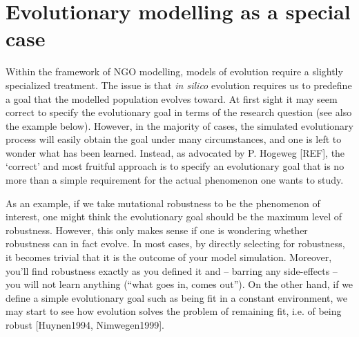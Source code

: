 \section{Evolutionary modelling as a special case}

Within the framework of NGO modelling, models of evolution require a slightly specialized treatment. The issue is that \emph{in silico} evolution requires us to predefine a goal that the modelled population evolves toward. At first sight it may seem correct to specify the evolutionary goal in terms of the research question (see also the example below). However, in the majority of cases, the simulated evolutionary process will easily obtain the goal under many circumstances, and one is left to wonder what has been learned. Instead, as advocated by P. Hogeweg [REF], the `correct' and most fruitful approach is to specify an evolutionary goal that is no more than a simple requirement for the actual phenomenon one wants to study. 

As an example, if we take mutational robustness to be the phenomenon of interest, one might think the evolutionary goal should be the maximum level of robustness. However, this only makes sense if one is wondering whether robustness can in fact evolve. In most cases, by directly selecting for robustness, it becomes trivial that it is the outcome of your model simulation. Moreover, you’ll find robustness exactly as you defined it and -- barring any side-effects -- you will not learn anything (``what goes in, comes out''). On the other hand, if we define a simple evolutionary goal such as being fit in a constant environment, we may start to see how evolution solves the problem of remaining fit, i.e. of being robust [Huynen1994, Nimwegen1999].
